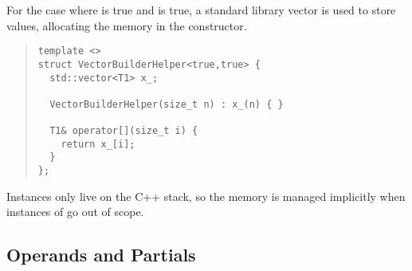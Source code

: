\documentclass[10pt]{article}
\begin{document}
For the case where  is true and  is true, a
standard library vector is used to store values, allocating the memory
in the constructor.
%
\begin{quote}
\begin{Verbatim}
template <>
struct VectorBuilderHelper<true,true> {
  std::vector<T1> x_;

  VectorBuilderHelper(size_t n) : x_(n) { }

  T1& operator[](size_t i) {
    return x_[i];
  }
};
\end{Verbatim}
\end{quote}
%
Instances only live on the C++ stack, so the memory is managed
implicitly when instances of  go out of scope.

\subsection{Operands and Partials}
\end{document}
